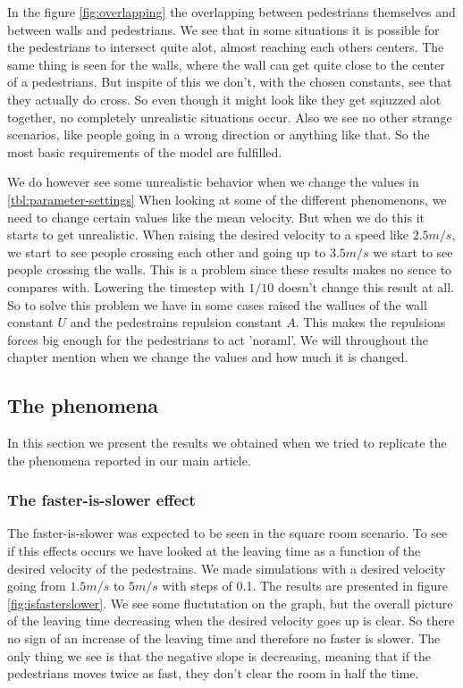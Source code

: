 In the figure \ref{fig:overlapping} the overlapping between pedestrians 
themselves and between walls and pedestrians. We see that in some situations 
it is possible for the pedestrians to intersect quite alot, almost reaching 
each others centers. The same thing is seen for the walls, where the wall 
can get quite close to the center of a pedestrians. But inspite of this 
we don't, with the chosen constants, see that they actually do cross. So 
even though it might look like they get sqiuzzed alot together, no completely 
unrealistic situations occur. Also we see no other strange scenarios, like 
people going in a wrong direction or anything like that. So the most basic 
requirements of the model are fulfilled. 

We do however see some unrealistic behavior when we change the values in 
\ref{tbl:parameter-settings} When looking at some of the different phenomenons, 
we need to change certain values like the mean velocity. But when we do 
this it starts to get unrealistic. When raising the desired velocity to 
a speed like $2.5m/s$, we start to see people crossing each other and going 
up to $3.5m/s$ we start to see people crossing the walls. This is a problem 
since these results makes no sence to compares with. Lowering the timestep 
with $1/10$ doesn't change this result at all. So to solve this problem we 
have in some cases raised the wallues of the wall constant $U$ and the 
pedestrains repulsion constant $A$. This makes the repulsions forces 
big enough for the pedestrians to act 'noraml'. We will throughout the 
chapter mention when we change the values and how much it is changed.

\subsection{The phenomena}
In this section we present the results we obtained when we 
tried to replicate the the phenomena reported in our main 
article.

\subsubsection{The faster-is-slower effect}
The faster-is-slower was expected to be seen in the square room scenario.
To see if this effects occurs we have looked at the leaving time as a function 
of the desired velocity of the pedestrains. We made simulations with a desired velocity
going from $1.5m/s$ to $5m/s$ with steps of 0.1. The results are presented in figure 
\ref{fig:isfasterslower}. We see some fluctutation on the graph, but the overall picture 
of the leaving time decreasing when the desired velocity goes up is clear. So there no sign of an increase of 
the leaving time and therefore no faster is slower. The only thing we see is that the negative slope is decreasing, meaning
 that if the pedestrians moves twice as fast, they don't clear the room in half the time. 

